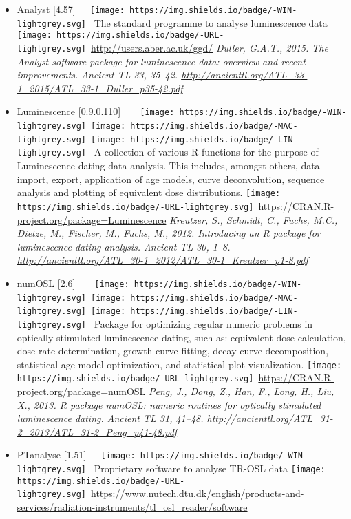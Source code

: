 \documentclass[]{article}
\providecommand{\tightlist}{%
  \setlength{\itemsep}{0pt}\setlength{\parskip}{0pt}}
\begin{document}
\begin{itemize}
\tightlist
\item
  Analyst {[}4.57{]}~~~\texttt{[image: https://img.shields.io/badge/-WIN-lightgrey.svg]}~
  The standard programme to analyse luminescence data
  \texttt{[image: https://img.shields.io/badge/-URL-lightgrey.svg]}~\url{http://users.aber.ac.uk/ggd/}
  \emph{Duller, G.A.T., 2015. The Analyst software package for luminescence data: overview and recent improvements. Ancient TL 33, 35--42. \url{http://ancienttl.org/ATL_33-1_2015/ATL_33-1_Duller_p35-42.pdf}}
\item
  Luminescence {[}0.9.0.110{]}~~~~\texttt{[image: https://img.shields.io/badge/-WIN-lightgrey.svg]}~\texttt{[image: https://img.shields.io/badge/-MAC-lightgrey.svg]}~\texttt{[image: https://img.shields.io/badge/-LIN-lightgrey.svg]}~
  A collection of various R functions for the purpose of Luminescence
  dating data analysis. This includes, amongst others, data import, export,
  application of age models, curve deconvolution, sequence analysis and
  plotting of equivalent dose distributions.
  \texttt{[image: https://img.shields.io/badge/-URL-lightgrey.svg]}~\url{https://CRAN.R-project.org/package=Luminescence}
  \emph{Kreutzer, S., Schmidt, C., Fuchs, M.C., Dietze, M., Fischer, M., Fuchs, M., 2012. Introducing an R package for luminescence dating analysis. Ancient TL 30, 1--8. \url{http://ancienttl.org/ATL_30-1_2012/ATL_30-1_Kreutzer_p1-8.pdf}}
\item
  numOSL {[}2.6{]}~~~~\texttt{[image: https://img.shields.io/badge/-WIN-lightgrey.svg]}~\texttt{[image: https://img.shields.io/badge/-MAC-lightgrey.svg]}~\texttt{[image: https://img.shields.io/badge/-LIN-lightgrey.svg]}~
  Package for optimizing regular numeric problems in optically stimulated luminescence
  dating, such as: equivalent dose calculation, dose rate determination, growth curve fitting,
  decay curve decomposition, statistical age model optimization, and statistical plot visualization.
  \texttt{[image: https://img.shields.io/badge/-URL-lightgrey.svg]}~\url{https://CRAN.R-project.org/package=numOSL}
  \emph{Peng, J., Dong, Z., Han, F., Long, H., Liu, X., 2013. R package numOSL: numeric routines for optically stimulated luminescence dating. Ancient TL 31, 41--48. \url{http://ancienttl.org/ATL_31-2_2013/ATL_31-2_Peng_p41-48.pdf}}
\item
  PTanalyse {[}1.51{]}~~~\texttt{[image: https://img.shields.io/badge/-WIN-lightgrey.svg]}~
  Proprietary software to analyse TR-OSL data
  \texttt{[image: https://img.shields.io/badge/-URL-lightgrey.svg]}~\url{https://www.nutech.dtu.dk/english/products-and-services/radiation-instruments/tl_osl_reader/software}

\end{itemize}
\end{document}
